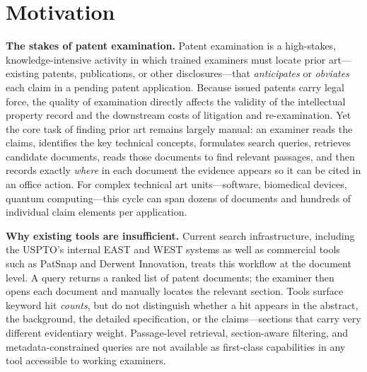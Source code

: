 \documentclass[sigconf]{acmart}
\begin{document}


\maketitle


\section{Motivation}

\smallskip\noindent\textbf{The stakes of patent examination.}
Patent examination is a high-stakes, knowledge-intensive activity in which
trained examiners must locate prior art---existing patents, publications, or
other disclosures---that \emph{anticipates} or \emph{obviates} each claim in a
pending patent application. Because issued patents carry legal force, the
quality of examination directly affects the validity of the intellectual
property record and the downstream costs of litigation and re-examination.
Yet the core task of finding prior art remains largely manual: an examiner
reads the claims, identifies the key technical concepts, formulates search
queries, retrieves candidate documents, reads those documents to find relevant
passages, and then records exactly \emph{where} in each document the evidence
appears so it can be cited in an office action. For complex technical art
units---software, biomedical devices, quantum computing---this cycle can span
dozens of documents and hundreds of individual claim elements per application.

\smallskip\noindent\textbf{Why existing tools are insufficient.}
Current search infrastructure, including the USPTO's internal EAST and WEST
systems as well as commercial tools such as PatSnap and Derwent Innovation,
treats this workflow at the document level. A query returns a ranked list of
patent documents; the examiner then opens each document and manually locates
the relevant section. Tools surface keyword hit \emph{counts}, but do not
distinguish whether a hit appears in the abstract, the background, the
detailed specification, or the claims---sections that carry very different
evidentiary weight. Passage-level retrieval, section-aware filtering, and
metadata-constrained queries are not available as first-class capabilities in
any tool accessible to working examiners.
\end{document}
